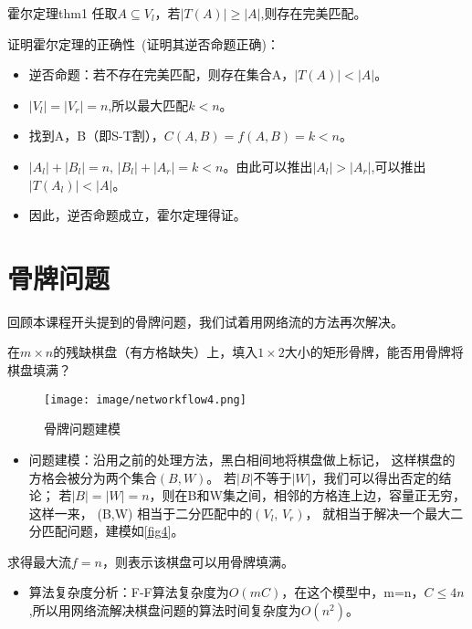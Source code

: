 \begin{theorem}{霍尔定理}{thm1}
	任取\(A \subseteq V_l\)，若\(|T(A)| \ge |A|\),则存在完美匹配。
\end{theorem}
证明霍尔定理的正确性~(证明其逆否命题正确)：
\begin{itemize}
	\item 逆否命题：若不存在完美匹配，则存在集合A，\(|T(A)| < |A|\)。
	\item \(|V_l|=|V_r|=n\),所以最大匹配\(k<n\)。
	\item 找到A，B（即S-T割），\(C(A,B) = f(A,B) = k<n\)。
	\item \(|A_l|+|B_l| = n,\,|B_l|+|A_r| = k < n\)。由此可以推出\(|A_l| > |A_r|\),可以推出\(|T(A_l)| < |A|\)。
	\item 因此，逆否命题成立，霍尔定理得证。
\end{itemize}

\section{骨牌问题}\label{sec:network-flows-tiling}
回顾本课程开头提到的骨牌问题，我们试着用网络流的方法再次解决。
\begin{example}
	在\(m \times n\)的残缺棋盘（有方格缺失）上，填入\(1 \times 2\)大小的矩形骨牌，能否用骨牌将棋盘填满？
\end{example}

\begin{figure}[htb]
	\centering
	\texttt{[image: image/networkflow4.png]}
	\caption{骨牌问题建模}\label{fig4}
\end{figure}

\begin{itemize}
	\item 问题建模：沿用之前的处理方法，黑白相间地将棋盘做上标记，
	      这样棋盘的方格会被分为两个集合\((B,W)\)。
	      若\(|B|\)不等于\(|W|\)，我们可以得出否定的结论；
	      若\(|B|=|W|=n\)，则在B和W集之间，相邻的方格连上边，容量正无穷，
	      这样一来， (B,W) 相当于二分匹配中的\((V_l,\,V_r)\)，
	      就相当于解决一个最大二分匹配问题，建模如\autoref{fig4}。
\end{itemize}

求得最大流\(f=n\)，则表示该棋盘可以用骨牌填满。
\begin{itemize}
	\item 算法复杂度分析：F-F算法复杂度为\(O(mC)\)，在这个模型中，m=n，\(C \le 4n\),所以用网络流解决棋盘问题的算法时间复杂度为\(O(n^2)\)。
\end{itemize}

